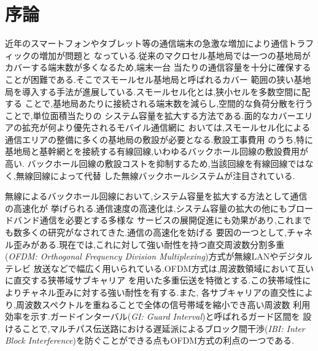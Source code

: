 \chapter{序論}

近年のスマートフォンやタブレット等の通信端末の急激な増加により通信トラフィックの増加が問題と
なっている.従来のマクロセル基地局では一つの基地局がカバーする端末数が多くなるため,端末一台
当たりの通信容量を十分に確保することが困難である.そこでスモールセル基地局と呼ばれるカバー
範囲の狭い基地局を導入する手法が進展している.スモールセル化とは,狭小セルを多数空間に配する
ことで,基地局あたりに接続される端末数を減らし,空間的な負荷分散を行うことで,単位面積当たりの
システム容量を拡大する方法である.面的なカバーエリアの拡充が何より優先されるモバイル通信網に
おいては,スモールセル化による通信エリアの整備に多くの基地局の敷設が必要となる.敷設工事費用
のうち,特に基地局と基幹網とを接続する有線回線,いわゆるバックホール回線の敷設費用が高い.
バックホール回線の敷設コストを抑制するため,当該回線を有線回線ではなく,無線回線によって代替
した無線バックホールシステムが注目されている.\cite{yamo} \cite{pabst}

無線によるバックホール回線において,システム容量を拡大する方法として通信の高速化が
挙げられる.通信速度の高速化は,システム容量の拡大の他にもブロードバンド通信を必要とする多様な
サービスの展開促進にも効果があり,これまでも数多くの研究がなされてきた.通信の高速化を妨げる
要因の一つとして,チャネル歪みがある.現在では,これに対して強い耐性を持つ直交周波数分割多重
(\emph{OFDM: Orthogonal Frequency Division Multiplexing})方式が無線LANやデジタルテレビ
放送などで幅広く用いられている.OFDM方式は,周波数領域において互いに直交する狭帯域サブキャリア
を用いた多重伝送を特徴とする.この狭帯域性によりチャネル歪みに対する強い耐性を有する.また,
各サブキャリアの直交性により,周波数スペクトルを重ねることで全体の信号帯域を縮小でき高い周波数
利用効率を示す.ガードインターバル(\emph{GI: Guard Interval})と呼ばれるガード区間を
設けることで,マルチパス伝送路における遅延派によるブロック間干渉(\emph{IBI: Inter Block
Interference})を防ぐことができる点もOFDM方式の利点の一つである.

